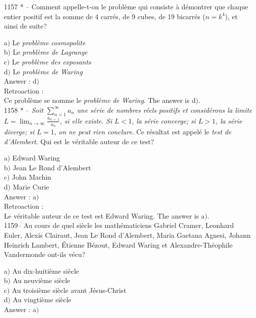 ﻿\documentclass[letterpaper, 12pt]{article}
\begin{document}
1157 * -- Comment appelle-t-on le probl\`eme qui consiste \`a
d\'emontrer que chaque entier positif est la somme de 4 carr\'es, de
9 cubes, de 19 bicarr\'es ($n=k^4$), et ainsi de suite?

a$)$ Le {\sl probl\`eme cosmopolite} \\
b$)$ Le {\sl probl\`eme de Lagrange} \\
c$)$ Le {\sl probl\`eme des exposants} \\
d$)$ Le {\sl probl\`eme de Waring}\\

Answer : d$)$\\

Retroaction : \\
Ce probl\`eme se nomme le {\sl probl\`eme de Waring}. The answer is
d$)$.\\

1158 * -- {\sl Soit $\sum_{n=1}^{\infty}a_n$ une s\'erie de nombres
r\'eels positifs et consid\'erons la limite
$L=\lim_{n\to\infty}\frac{a_{n\,+\,1}}{a_n}$, si elle existe. Si
$L<1$, la s\'erie converge; si $L>1$, la s\'erie diverge; si $L=1$,
on ne peut rien conclure}. Ce r\'esultat est appel\'e le {\sl test
de d'Alembert}. Qui est le v\'eritable auteur de ce test?

a$)$ Edward Waring \\
b$)$ Jean Le Rond d'Alembert \\
c$)$ John Machin \\
d$)$ Marie Curie\\

Answer : a$)$\\

Retroaction : \\
Le v\'eritable auteur de ce test est Edward Waring. The answer is a$)$.\\

1159-- Au cours de quel si\`ecle les math\'ematiciens Gabriel
Cramer, Leonhard Euler, Alexis Clairaut, Jean Le Rond d'Alembert,
Maria Gaetana Agnesi, Johann Heinrich Lambert, \'Etienne B\'ezout,
Edward Waring et Alexandre-Th\'eophile Vandermonde ont-ils v\'ecu?

a$)$ Au dix-huiti\`eme si\`ecle \\
b$)$ Au neuvi\`eme si\`ecle \\
c$)$ Au troisi\`eme si\`ecle avant J\'esus-Christ \\
d$)$ Au vingti\`eme si\`ecle   \\

Answer : a$)$\\
\end{document}
